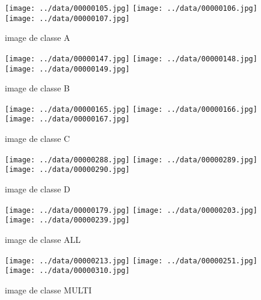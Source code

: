 \documentclass{book}
\begin{document}
\begin{figure}
\begin{center}
\texttt{[image: ../data/00000105.jpg]}
\texttt{[image: ../data/00000106.jpg]}
\texttt{[image: ../data/00000107.jpg]}
\end{center}
\caption{image de classe A}
\label{classeA}
\end{figure}

\begin{figure}
\begin{center}
\texttt{[image: ../data/00000147.jpg]}
\texttt{[image: ../data/00000148.jpg]}
\texttt{[image: ../data/00000149.jpg]}
\end{center}
\caption{image de classe B}
\label{classeB}
\end{figure}

\begin{figure}
\begin{center}
\texttt{[image: ../data/00000165.jpg]}
\texttt{[image: ../data/00000166.jpg]}
\texttt{[image: ../data/00000167.jpg]}
\end{center}
\caption{image de classe C}
\label{classeC}
\end{figure}

\begin{figure}
\begin{center}
\texttt{[image: ../data/00000288.jpg]}
\texttt{[image: ../data/00000289.jpg]}
\texttt{[image: ../data/00000290.jpg]}
\end{center}
\caption{image de classe D}
\label{classeD}
\end{figure}

\begin{figure}
\begin{center}
\texttt{[image: ../data/00000179.jpg]}
\texttt{[image: ../data/00000203.jpg]}
\texttt{[image: ../data/00000239.jpg]}
\end{center}
\caption{image de classe ALL}
\label{classeALL}
\end{figure}

\begin{figure}
\begin{center}
\texttt{[image: ../data/00000213.jpg]}
\texttt{[image: ../data/00000251.jpg]}
\texttt{[image: ../data/00000310.jpg]}
\end{center}
\caption{image de classe MULTI}
\label{classeMULTI}
\end{figure}
\end{document}
